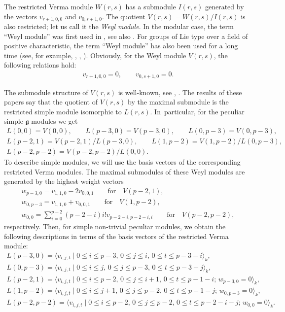 \documentclass[10pt,a4paper]{amsart}
\numberwithin{equation}{section}
\begin{document}
The restricted Verma module $W(r,s)$ has a submodule $I(r,s)$ generated by the vectors $v_{r+1,0,0}$ and $v_{0,s+1,0}$.
The quotient $V(r,s)=W(r,s)/I(r,s)$ is also restricted; let us call it the {\it Weyl module}. In the modular case, the term ``Weyl module'' was first used in \cite[p.~321]{S80}, see also \cite[p.~59]{F88}. For groups of Lie type over a field of positive characteristic, the term ``Weyl module'' has also been used for a long time (see, for example, \cite[p.~213]{CaL74}, \cite[p.~262]{Humph80}, \cite[p.~291]{Jan80}). Obviously, for the Weyl module $V(r,s)$, the following relations hold:
\begin{gather*}
v_{r+1,0,0}=0,\qquad v_{0,s+1,0}=0.
\end{gather*}

The submodule structure of $V(r,s)$ is well-known, see \cite[p.~484]{B67}, \cite[pp.~151 and~157]{Rud78}. The results of these papers say that the quotient of $V(r,s)$ by the
maximal submodule is the restricted simple module isomorphic to $L(r,s)$. In~particular, for the peculiar simple $\mathfrak{g}$-modules we get
\begin{gather*}
L(0,0)=V(0,0),\qquad L(p-3,0)=V(p-3,0),\qquad L(0,p-3)=V(0,p-3),
\\
L(p-2,1)=V(p-2,1)/L(p-3,0),\qquad L(1,p-2)=V(1,p-2)/L(0,p-3),
\\
L(p-2,p-2)=V(p-2,p-2)/L(0,0).
\end{gather*}
To describe simple modules, we will use the basis vectors of the corresponding restricted Verma modules. The maximal submodules of these Weyl modules are generated by the highest weight vectors
\begin{gather*}
w_{p-3,0}=v_{1,1,0}-2v_{0,0,1}\qquad \text{for}\quad V(p-2,1),
\\
w_{0,p-3}=v_{1,1,0}+v_{0,0,1}\qquad \text{for}\quad V(1,p-2),
\\
w_{0,0}=\sum_{i=0}^{p-2}(p-2-i)i!v_{p-2-i,p-2-i,i}\qquad \text{for}\quad V(p-2,p-2),
\end{gather*}
respectively.
Then, for simple non-trivial peculiar modules, we obtain the following descriptions in terms of the basis vectors of the restricted Verma module:
\begin{gather*}
L(p-3,0)=\langle v_{i,j,t}\mid 0\leq i\leq p-3,\,0\leq j\leq i,\,0\leq t\leq p-3-i\rangle_{k},
\\
L(0,p-3)=\langle v_{i,j,t}\mid 0\leq i\leq j,\,0\leq j\leq p-3,\,0\leq t\leq p-3-j\rangle_{k},
\\
L(p-2,1)=\langle v_{i,j,t}\mid 0\leq i\leq p-2,\,0\leq j\leq i+1,\,0\leq t\leq p-1-i;\,w_{p-3,0}=0\rangle_{k},
\\
L(1,p-2)=\langle v_{i,j,t}\mid 0\leq i\leq j+1,\,0\leq j\leq p-2,\,0\leq t\leq p-1-j;\,w_{0,p-3}=0\rangle_{k},
\\
L(p-2,p-2)=\langle v_{i,j,t}\mid 0\leq i\leq p-2,\,0\leq j\leq p-2,\,0\leq t\leq p-2-i-j;\,w_{0,0}=0\rangle_{k}.
\end{gather*}
\end{document}
